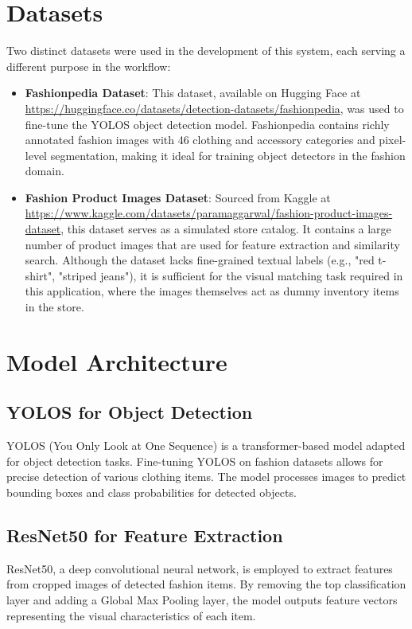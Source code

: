 \section*{Datasets}

Two distinct datasets were used in the development of this system, each serving a different purpose in the workflow:

\begin{itemize}
    \item \textbf{Fashionpedia Dataset}: This dataset, available on Hugging Face at \url{https://huggingface.co/datasets/detection-datasets/fashionpedia}, was used to fine-tune the YOLOS object detection model. Fashionpedia contains richly annotated fashion images with 46 clothing and accessory categories and pixel-level segmentation, making it ideal for training object detectors in the fashion domain.

    \item \textbf{Fashion Product Images Dataset}: Sourced from Kaggle at \url{https://www.kaggle.com/datasets/paramaggarwal/fashion-product-images-dataset}, this dataset serves as a simulated store catalog. It contains a large number of product images that are used for feature extraction and similarity search. Although the dataset lacks fine-grained textual labels (e.g., "red t-shirt", "striped jeans"), it is sufficient for the visual matching task required in this application, where the images themselves act as dummy inventory items in the store.
\end{itemize}



\section*{Model Architecture}

\subsection*{YOLOS for Object Detection}
YOLOS (You Only Look at One Sequence) is a transformer-based model adapted for object detection tasks. Fine-tuning YOLOS on fashion datasets allows for precise detection of various clothing items. The model processes images to predict bounding boxes and class probabilities for detected objects.

\subsection*{ResNet50 for Feature Extraction}
ResNet50, a deep convolutional neural network, is employed to extract features from cropped images of detected fashion items. By removing the top classification layer and adding a Global Max Pooling layer, the model outputs feature vectors representing the visual characteristics of each item.

